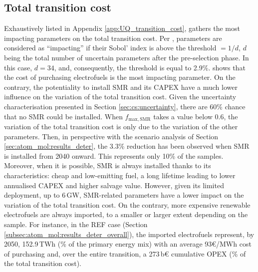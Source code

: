 \subsection{Total transition cost}
\label{subsec:atom_mol:results_uq_cost}
Exhaustively listed in Appendix \ref{app:UQ_transition_cost},  gathers the most impacting parameters on the total transition cost. Per \citet{Turati2017}, parameters are considered as ``impacting'' if their Sobol' index is above the threshold $=1/d$, $d$ being the total number of uncertain parameters after the pre-selection phase. In this case, $d=34$, and, consequently, the threshold is equal to 2.9\%.  shows that the cost of purchasing electrofuels is the most impacting parameter. On the contrary, the potentiality to install \gls{SMR} and its CAPEX have a much lower influence on the variation of the total transition cost. Given the uncertainty characterisation presented in Section \ref{sec:cs:uncertainty}, there are 60\% chance that no \gls{SMR} could be installed. When $f_{\mathrm{max,SMR}}$ takes a value below 0.6, the variation of the total transition cost is only due to the variation of the other parameters. Then, in perspective with the scenario analysis of Section \ref{sec:atom_mol:results_deter}, the 3.3\% reduction has been observed when \gls{SMR} is installed from 2040 onward. This represents only 10\% of the samples. Moreover, when it is possible, \gls{SMR} is always installed thanks to its characteristics: cheap and low-emitting fuel, a long lifetime leading to lower annualised CAPEX and higher salvage value. However, given its limited deployment, up to 6\,GW, \gls{SMR}-related parameters have a lower impact on the variation of the total transition cost. On the contrary, more expensive renewable electrofuels are always imported, to a smaller or larger extent depending on the sample. For instance, in the REF case (Section \ref{subsec:atom_mol:results_deter_overall}), the imported electrofuels represent, by 2050, 152.9\,TWh (\% of the primary energy mix) with an average 93€/MWh cost of purchasing and, over the entire transition, a 273\,b€ cumulative OPEX (\% of the total transition cost).

